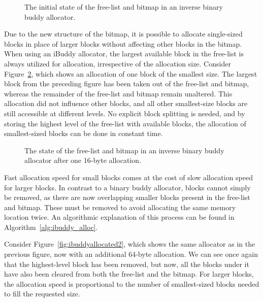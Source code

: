 \begin{figure}[h]
    \centering
    
    \caption{The initial state of the free-list and bitmap in an inverse binary buddy allocator.}
    \label{fig:ibuddyinitial}
\end{figure}

Due to the new structure of the bitmap, it is possible to allocate single-sized blocks in place of larger blocks without affecting other blocks in the bitmap. When using an iBuddy allocator, the largest available block in the free-list is always utilized for allocation, irrespective of the allocation size. Consider Figure~\ref{fig:ibuddyallocated}, which shows an allocation of one block of the smallest size. The largest block from the preceding figure has been taken out of the free-list and bitmap, whereas the remainder of the free-list and bitmap remain unaltered. This allocation did not influence other blocks, and all other smallest-size blocks are still accessible at different levels. No explicit block splitting is needed, and by storing the highest level of the free-list with available blocks, the allocation of smallest-sized blocks can be done in constant time.

\begin{figure}[h]
    \centering
    
    \caption{The state of the free-list and bitmap in an inverse binary buddy allocator after one
        16-byte allocation.}
    \label{fig:ibuddyallocated}
\end{figure}

Fast allocation speed for small blocks comes at the cost of slow allocation speed for larger blocks. In contrast to a binary buddy allocator, blocks cannot simply be removed, as there are now overlapping smaller blocks present in the free-list and bitmap. These must be removed to avoid allocating the same memory location twice. An algorithmic explanation of this process can be found in Algorithm~\ref{alg:ibuddy_alloc}.

Consider Figure~\ref{fig:ibuddyallocated2}, which shows the same allocator as in the previous figure, now with an additional 64-byte allocation. We can see once again that the highest-level block has been removed, but now, all the blocks under it have also been cleared from both the free-list and the bitmap. For larger blocks, the allocation speed is proportional to the number of smallest-sized blocks needed to fill the requested size.

